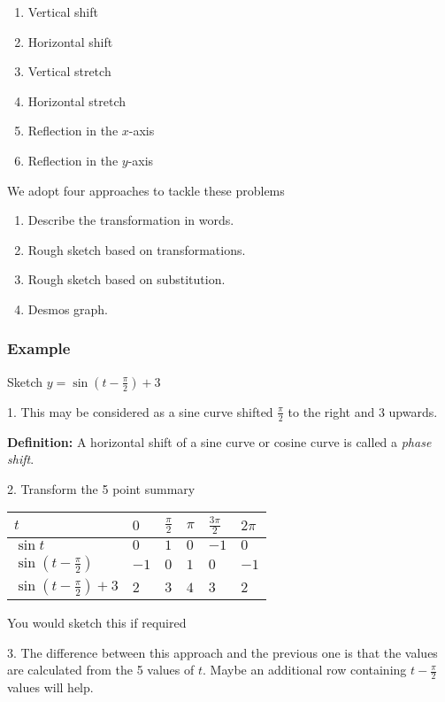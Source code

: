 \begin{enumerate}
	\item Vertical shift 
	\item Horizontal shift 
	\item Vertical stretch 
	\item Horizontal stretch 
	\item Reflection in the $x$-axis 
	\item Reflection in the $y$-axis 
\end{enumerate}

We adopt four approaches to tackle these problems 

\begin{enumerate}
	\item Describe the transformation in words. 
	\item Rough sketch based on transformations. 
	\item Rough sketch based on substitution. 
	\item Desmos
	graph. 
\end{enumerate}


\subsubsection{Example}
Sketch $y =\sin  \left (t -\frac{\pi }{2}\right ) +3$ 

1. This may be considered as a sine curve shifted $\frac{\pi }{2}$ to the right and $3$ upwards. 

\textbf{Definition:} A horizontal shift of a sine curve or cosine curve is called a \emph{phase
	shift}. 

2. Transform the 5 point summary 


\begin{tabular}[c]{|l|l|l|l|l|l|}\hline
	$t$  & $0$  & $\frac{\pi }{2}$  & $\pi $  & $\frac{3 \pi }{2}$  & $2 \pi $  \\
	\hline
	$\sin  t$  & $0$  & $1$  & $0$  & $ -1$  & $0$  \\
	\hline
	$\sin  \left (t -\frac{\pi }{2}\right )$  & $ -1$  & $0$  & $1$  & $0$  & $ -1$  \\
	\hline
	$\sin  \left (t -\frac{\pi }{2}\right ) +3$  & $2$  & $3$  & $4$  & $3$  & $2$  \\
	\hline
\end{tabular}

You would sketch this if required 

3. The difference between this approach and the previous one is that the values are calculated
from the 5 values of $t$. Maybe an additional row containing $t -\frac{\pi }{2}$ values will help. 


